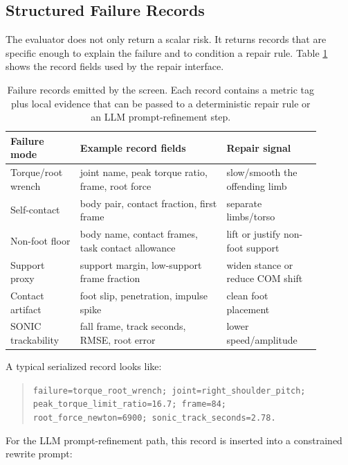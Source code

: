 \documentclass[10pt]{article}
\begin{document}
\subsection{Structured Failure Records}

The evaluator does not only return a scalar risk. It returns records that are
specific enough to explain the failure and to condition a repair rule. Table
\ref{tab:records} shows the record fields used by the repair interface.

\begin{table}[h]
\centering
\caption{Failure records emitted by the screen. Each record contains a metric
tag plus local evidence that can be passed to a deterministic repair rule or an
LLM prompt-refinement step.}
\label{tab:records}
\small
\begin{tabular}{p{0.20\linewidth}p{0.42\linewidth}p{0.27\linewidth}}
\toprule
Failure mode & Example record fields & Repair signal \\
\midrule
Torque/root wrench & joint name, peak torque ratio, frame, root force & slow/smooth the offending limb \\
Self-contact & body pair, contact fraction, first frame & separate limbs/torso \\
Non-foot floor & body name, contact frames, task contact allowance & lift or justify non-foot support \\
Support proxy & support margin, low-support frame fraction & widen stance or reduce COM shift \\
Contact artifact & foot slip, penetration, impulse spike & clean foot placement \\
SONIC trackability & fall frame, track seconds, RMSE, root error & lower speed/amplitude \\
\bottomrule
\end{tabular}
\end{table}

A typical serialized record looks like:

\begin{quote}\small
\texttt{failure=torque\_root\_wrench; joint=right\_shoulder\_pitch;}\\
\texttt{peak\_torque\_limit\_ratio=16.7; frame=84;}\\
\texttt{root\_force\_newton=6900; sonic\_track\_seconds=2.78.}
\end{quote}

For the LLM prompt-refinement path, this record is inserted into a constrained
rewrite prompt:
\end{document}
